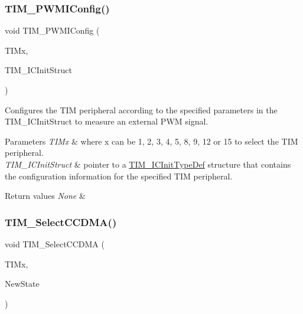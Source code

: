 \subsubsection{\texorpdfstring{TIM\_PWMIConfig()}{TIM\_PWMIConfig()}}
{\footnotesize\ttfamily void T\+I\+M\+\_\+\+P\+W\+M\+I\+Config (\begin{DoxyParamCaption}\item[{\mbox{\hyperlink{struct_t_i_m___type_def}{T\+I\+M\+\_\+\+Type\+Def}} $\ast$}]{T\+I\+Mx,  }\item[{\mbox{\hyperlink{struct_t_i_m___i_c_init_type_def}{T\+I\+M\+\_\+\+I\+C\+Init\+Type\+Def}} $\ast$}]{T\+I\+M\+\_\+\+I\+C\+Init\+Struct }\end{DoxyParamCaption})}



Configures the T\+IM peripheral according to the specified parameters in the T\+I\+M\+\_\+\+I\+C\+Init\+Struct to measure an external P\+WM signal. 


\begin{DoxyParams}{Parameters}
{\em T\+I\+Mx} & where x can be 1, 2, 3, 4, 5, 8, 9, 12 or 15 to select the T\+IM peripheral. \\
\hline
{\em T\+I\+M\+\_\+\+I\+C\+Init\+Struct} & pointer to a \mbox{\hyperlink{struct_t_i_m___i_c_init_type_def}{T\+I\+M\+\_\+\+I\+C\+Init\+Type\+Def}} structure that contains the configuration information for the specified T\+IM peripheral. \\
\hline
\end{DoxyParams}

\begin{DoxyRetVals}{Return values}
{\em None} & \\
\hline
\end{DoxyRetVals}
\mbox{\label{group___t_i_m___exported___functions_ga5273cb65acb885fe7982827b1c6b7d75}} 
\subsubsection{\texorpdfstring{TIM\_SelectCCDMA()}{TIM\_SelectCCDMA()}}
{\footnotesize\ttfamily void T\+I\+M\+\_\+\+Select\+C\+C\+D\+MA (\begin{DoxyParamCaption}\item[{\mbox{\hyperlink{struct_t_i_m___type_def}{T\+I\+M\+\_\+\+Type\+Def}} $\ast$}]{T\+I\+Mx,  }\item[{\mbox{\hyperlink{group___exported__types_gac9a7e9a35d2513ec15c3b537aaa4fba1}{Functional\+State}}}]{New\+State }\end{DoxyParamCaption})}



